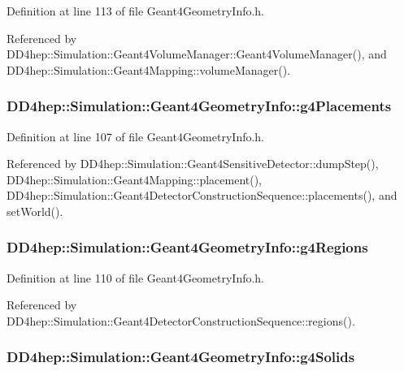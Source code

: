 Definition at line 113 of file Geant4GeometryInfo.h.

Referenced by DD4hep::Simulation::Geant4VolumeManager::Geant4VolumeManager(), and DD4hep::Simulation::Geant4Mapping::volumeManager().\hypertarget{class_d_d4hep_1_1_simulation_1_1_geant4_geometry_info_aa99d9cc649a22de3dc3f05f07558951a}{
\subsubsection[{g4Placements}]{ {\bf DD4hep::Simulation::Geant4GeometryInfo::g4Placements}}}
\label{class_d_d4hep_1_1_simulation_1_1_geant4_geometry_info_aa99d9cc649a22de3dc3f05f07558951a}


Definition at line 107 of file Geant4GeometryInfo.h.

Referenced by DD4hep::Simulation::Geant4SensitiveDetector::dumpStep(), DD4hep::Simulation::Geant4Mapping::placement(), DD4hep::Simulation::Geant4DetectorConstructionSequence::placements(), and setWorld().\hypertarget{class_d_d4hep_1_1_simulation_1_1_geant4_geometry_info_aee8fb6dc1279abe93e73ccf67c41d011}{
\subsubsection[{g4Regions}]{ {\bf DD4hep::Simulation::Geant4GeometryInfo::g4Regions}}}
\label{class_d_d4hep_1_1_simulation_1_1_geant4_geometry_info_aee8fb6dc1279abe93e73ccf67c41d011}


Definition at line 110 of file Geant4GeometryInfo.h.

Referenced by DD4hep::Simulation::Geant4DetectorConstructionSequence::regions().\hypertarget{class_d_d4hep_1_1_simulation_1_1_geant4_geometry_info_ad35660bb944a3d8133ef17abeb898d0f}{
\subsubsection[{g4Solids}]{ {\bf DD4hep::Simulation::Geant4GeometryInfo::g4Solids}}}
\label{class_d_d4hep_1_1_simulation_1_1_geant4_geometry_info_ad35660bb944a3d8133ef17abeb898d0f}



